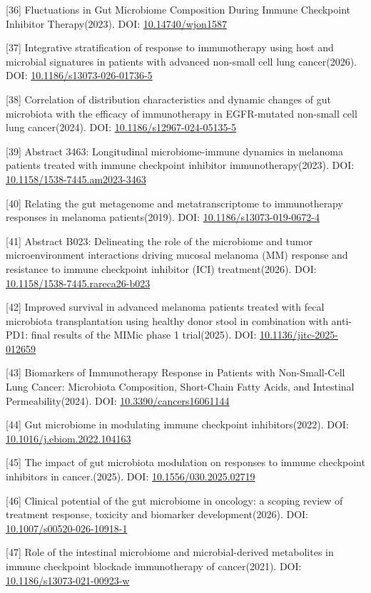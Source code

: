 \documentclass[11pt]{article}
\begin{document}
{[}36{]} Fluctuations in Gut Microbiome Composition During Immune Checkpoint Inhibitor Therapy(2023). DOI: \url{10.14740/wjon1587}

{[}37{]} Integrative stratification of response to immunotherapy using host and microbial signatures in patients with advanced non-small cell lung cancer(2026). DOI: \url{10.1186/s13073-026-01736-5}

{[}38{]} Correlation of distribution characteristics and dynamic changes of gut microbiota with the efficacy of immunotherapy in EGFR-mutated non-small cell lung cancer(2024). DOI: \url{10.1186/s12967-024-05135-5}

{[}39{]} Abstract 3463: Longitudinal microbiome-immune dynamics in melanoma patients treated with immune checkpoint inhibitor immunotherapy(2023). DOI: \url{10.1158/1538-7445.am2023-3463}

{[}40{]} Relating the gut metagenome and metatranscriptome to immunotherapy responses in melanoma patients(2019). DOI: \url{10.1186/s13073-019-0672-4}

{[}41{]} Abstract B023: Delineating the role of the microbiome and tumor microenvironment interactions driving mucosal melanoma (MM) response and resistance to immune checkpoint inhibitor (ICI) treatment(2026). DOI: \url{10.1158/1538-7445.rareca26-b023}

{[}42{]} Improved survival in advanced melanoma patients treated with fecal microbiota transplantation using healthy donor stool in combination with anti-PD1: final results of the MIMic phase 1 trial(2025). DOI: \url{10.1136/jitc-2025-012659}

{[}43{]} Biomarkers of Immunotherapy Response in Patients with Non-Small-Cell Lung Cancer: Microbiota Composition, Short-Chain Fatty Acids, and Intestinal Permeability(2024). DOI: \url{10.3390/cancers16061144}

{[}44{]} Gut microbiome in modulating immune checkpoint inhibitors(2022). DOI: \url{10.1016/j.ebiom.2022.104163}

{[}45{]} The impact of gut microbiota modulation on responses to immune checkpoint inhibitors in cancer.(2025). DOI: \url{10.1556/030.2025.02719}

{[}46{]} Clinical potential of the gut microbiome in oncology: a scoping review of treatment response, toxicity and biomarker development(2026). DOI: \url{10.1007/s00520-026-10918-1}

{[}47{]} Role of the intestinal microbiome and microbial-derived metabolites in immune checkpoint blockade immunotherapy of cancer(2021). DOI: \url{10.1186/s13073-021-00923-w}
\end{document}
